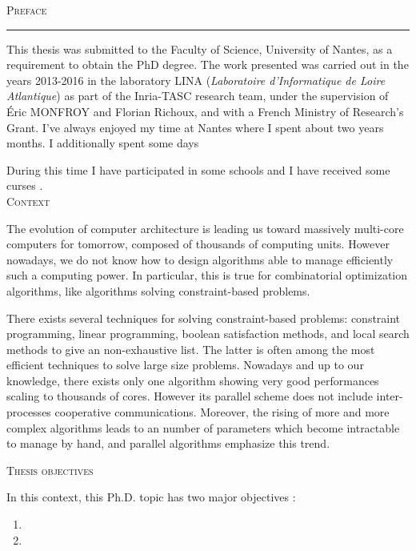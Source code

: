 \thispagestyle{empty}
\vspace*{3cm}
\noindent\Huge\textsc{Preface}\\
\normalsize
\noindent\rule[2pt]{\textwidth}{0.8pt}
\hspace*{3cm}

 This thesis was submitted to the Faculty of Science, University of Nantes, as a requirement to obtain the PhD degree. The work presented was carried out in the years 2013-2016 in the laboratory LINA ({\it Laboratoire d'Informatique de Loire Atlantique}) as part of the Inria-TASC research team, under the supervision of \'Eric {\sc MONFROY} and Florian {\sc Richoux}, and with a French Ministry of Research's Grant. I've always enjoyed my time at Nantes where I spent about two years months. I additionally spent some days 
 
 During this time I have participated in some schools  and I have received some curses .\\
 
 \Large\textsc{Context}\normalsize
 
 The evolution of computer architecture is leading us toward massively multi-core computers for tomorrow, composed of thousands of computing units. However nowadays, we do not know how to design algorithms able to manage efficiently such a computing power. In particular, this is true for combinatorial optimization algorithms, like algorithms solving constraint-based problems.
 
 There exists several techniques for solving constraint-based problems: constraint programming, linear programming, boolean satisfaction methods, and local search methods to give an non-exhaustive list. The latter is often among the most efficient techniques to solve large size problems. Nowadays and up to our knowledge, there exists only one algorithm showing very good performances scaling to thousands of cores. However its parallel scheme does not include inter-processes cooperative communications. Moreover, the rising of more and more complex algorithms leads to an number of parameters which become intractable to manage by hand, and parallel algorithms emphasize this trend.
 
 \Large\textsc{Thesis objectives}\normalsize
 
 In this context, this Ph.D. topic has two major objectives : 
 \begin{enumerate}
 	\item {}
 	
 	\item {}
 \end{enumerate}
 
